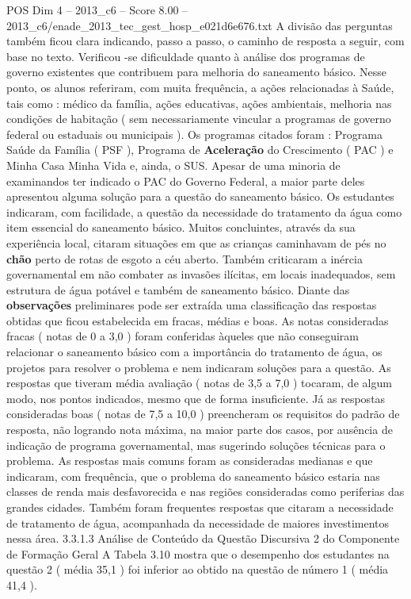 \begin{textsample}{POS Dim 4 – 2013\_c6 – Score 8.00 – 2013\_c6/enade\_2013\_tec\_gest\_hosp\_e021d6e676.txt}
A divisão das perguntas também ficou clara indicando, passo a passo, o caminho de resposta a seguir, com base no texto.
Verificou -se dificuldade quanto à análise dos programas de governo existentes que contribuem para melhoria do saneamento básico.
Nesse ponto, os alunos referiram, com muita frequência, a ações relacionadas à Saúde, tais como : médico da família, ações educativas, ações ambientais, melhoria nas condições de habitação ( sem necessariamente vincular a programas de governo federal ou estaduais ou municipais ).
Os programas citados foram : Programa Saúde da Família ( PSF ), Programa de \textbf{Aceleração} do Crescimento ( PAC ) e Minha Casa Minha Vida e, ainda, o SUS.
Apesar de uma minoria de examinandos ter indicado o PAC do Governo Federal, a maior parte deles apresentou alguma solução para a questão do saneamento básico.
Os estudantes indicaram, com facilidade, a questão da necessidade do tratamento da água como item essencial do saneamento básico.
Muitos concluintes, através da sua experiência local, citaram situações em que as crianças caminhavam de pés no \textbf{chão} perto de rotas de esgoto a céu aberto.
Também criticaram a inércia governamental em não combater as invasões ilícitas, em locais inadequados, sem estrutura de água potável e também de saneamento básico.
Diante das \textbf{observações} preliminares pode ser extraída uma classificação das respostas obtidas que ficou estabelecida em fracas, médias e boas.
As notas consideradas fracas ( notas de 0 a 3,0 ) foram conferidas àqueles que não conseguiram relacionar o saneamento básico com a importância do tratamento de água, os projetos para resolver o problema e nem indicaram soluções para a questão.
As respostas que tiveram média avaliação ( notas de 3,5 a 7,0 ) tocaram, de algum modo, nos pontos indicados, mesmo que de forma insuficiente.
Já as respostas consideradas boas ( notas de 7,5 a 10,0 ) preencheram os requisitos do padrão de resposta, não logrando nota máxima, na maior parte dos casos, por ausência de indicação de programa governamental, mas sugerindo soluções técnicas para o problema.
As respostas mais comuns foram as consideradas medianas e que indicaram, com frequência, que o problema do saneamento básico estaria nas classes de renda mais desfavorecida e nas regiões consideradas como periferias das grandes cidades.
Também foram frequentes respostas que citaram a necessidade de tratamento de água, acompanhada da necessidade de maiores investimentos nessa área. 3.3.1.3 Análise de Conteúdo da Questão Discursiva 2 do Componente de Formação Geral A Tabela 3.10 mostra que o desempenho dos estudantes na questão 2 ( média 35,1 ) foi inferior ao obtido na questão de número 1 ( média 41,4 ).

\end{textsample}
